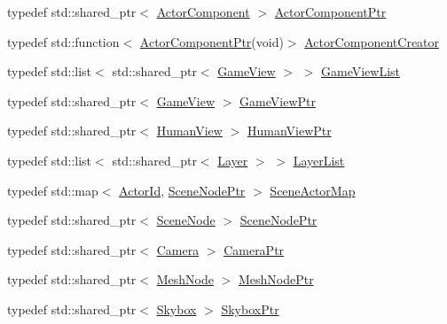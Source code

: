 \begin{DoxyCompactItemize}
\item 
typedef std\+::shared\+\_\+ptr$<$ \hyperlink{classTarbora_1_1ActorComponent}{Actor\+Component} $>$ \hyperlink{namespaceTarbora_a6cb50842d4c7a635fc744b4298b23e94}{Actor\+Component\+Ptr}
\item 
typedef std\+::function$<$ \hyperlink{namespaceTarbora_a6cb50842d4c7a635fc744b4298b23e94}{Actor\+Component\+Ptr}(void)$>$ \hyperlink{namespaceTarbora_a82ab1ffad47e841a33a04227c0750f36}{Actor\+Component\+Creator}
\item 
typedef std\+::list$<$ std\+::shared\+\_\+ptr$<$ \hyperlink{classTarbora_1_1GameView}{Game\+View} $>$ $>$ \hyperlink{namespaceTarbora_a56e11e2432d7da50caa0fb6a1633a3ad}{Game\+View\+List}
\item 
typedef std\+::shared\+\_\+ptr$<$ \hyperlink{classTarbora_1_1GameView}{Game\+View} $>$ \hyperlink{namespaceTarbora_a4267051f12bbb76c4730610ab987d0bf}{Game\+View\+Ptr}
\item 
typedef std\+::shared\+\_\+ptr$<$ \hyperlink{classTarbora_1_1HumanView}{Human\+View} $>$ \hyperlink{namespaceTarbora_ae1b20477ea6a4f1774565201d193e0c1}{Human\+View\+Ptr}
\item 
typedef std\+::list$<$ std\+::shared\+\_\+ptr$<$ \hyperlink{classTarbora_1_1Layer}{Layer} $>$ $>$ \hyperlink{namespaceTarbora_aee2ef7c48625ede704b0513d7fe097e3}{Layer\+List}
\item 
typedef std\+::map$<$ \hyperlink{Global_8hpp_a2e71a876c4eb419c50f28a6c25a68ad2}{Actor\+Id}, \hyperlink{namespaceTarbora_a327c3a2ca2a7015a49e2cf0b926c47f1}{Scene\+Node\+Ptr} $>$ \hyperlink{namespaceTarbora_ae56af1ecaca4452fbf915c3c23354a9b}{Scene\+Actor\+Map}
\item 
typedef std\+::shared\+\_\+ptr$<$ \hyperlink{classTarbora_1_1SceneNode}{Scene\+Node} $>$ \hyperlink{namespaceTarbora_a327c3a2ca2a7015a49e2cf0b926c47f1}{Scene\+Node\+Ptr}
\item 
typedef std\+::shared\+\_\+ptr$<$ \hyperlink{classTarbora_1_1Camera}{Camera} $>$ \hyperlink{namespaceTarbora_ae4a9d4d5fbd397316e4c5cdba64ded4d}{Camera\+Ptr}
\item 
typedef std\+::shared\+\_\+ptr$<$ \hyperlink{classTarbora_1_1MeshNode}{Mesh\+Node} $>$ \hyperlink{namespaceTarbora_a2b0f11b1d7dcdb105476d7168fdc8f26}{Mesh\+Node\+Ptr}
\item 
typedef std\+::shared\+\_\+ptr$<$ \hyperlink{classTarbora_1_1Skybox}{Skybox} $>$ \hyperlink{namespaceTarbora_aae4c8a51ae0acbb58f3e82b4a686db98}{Skybox\+Ptr}
\end{DoxyCompactItemize}
